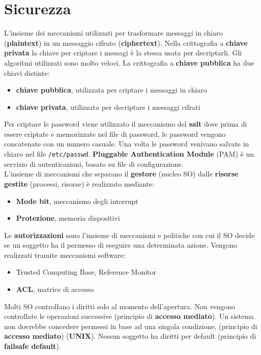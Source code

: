 \documentclass{article}
\begin{document}
\section{Sicurezza}

L'insieme dei meccanismi utilizzati per trasformare messaggi in chiaro (\textbf{plaintext}) in un messaggio cifrato (\textbf{ciphertext}). Nella crittografia a \textbf{chiave privata} la chiave per criptare i messagi è la stessa usata per decriptarli. Gli algoritmi utilizzati sono molto veloci.
La crittografia a \textbf{chiave pubblica} ha due chiavi distinte:
\begin{itemize}
  \item \textbf{chiave pubblica}, utilizzata per criptare i messaggi in chiaro
  \item \textbf{chiave privata}, utilizzata per decriptare i messaggi cifrati
\end{itemize}
Per criptare le password viene utilizzato il meccanismo del \textbf{salt} dove prima di essere criptate e memorizzate nel file di password, le password vengono concatenate con un numero casuale. Una volta le password venivano salvate in chiaro nel file \texttt{/etc/passwd}. 
\textbf{Pluggable Authentication Module} (PAM) è un servizio di autenticazioni, basato su file di configurazione.\\
L'insieme di meccanismi che separano il \textbf{gestore} (nucleo SO) dalle \textbf{risorse gestite} (processi, risorse) è realizzato mediante:
\begin{itemize}
  \item \textbf{Mode bit}, meccanismo degli interrupt
  \item \textbf{Protezione}, memoria dispositivi
\end{itemize}
Le \textbf{autorizzazioni} sono l'insieme di meccanismi e politiche con cui il SO decide se un soggetto ha il permesso di eseguire una determinata azione. Vengono realizzati tramite meccanismi software:
\begin{itemize}
  \item Trusted Computing Base, Reference Monitor
  \item \textbf{ACL}, matrice di accesso
\end{itemize}
Molti SO controllano i diritti solo al momento dell'apertura. Non vengono controllate le operazioni successive (principio di \textbf{accesso mediato}). Un sistema non dovrebbe concedere permessi in base ad una singola condizione, (principio di \textbf{accesso mediato})  (\textbf{UNIX}). Nessun soggetto ha diritti per default (principio di \textbf{failsafe default}).\\
\end{document}
